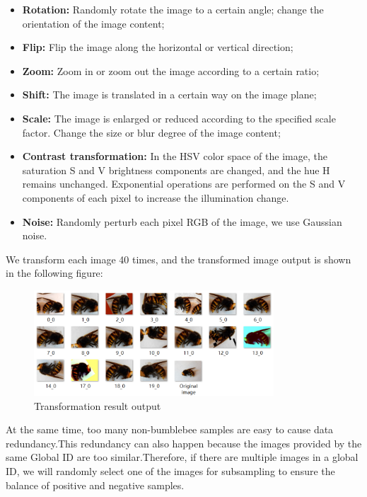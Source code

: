 \documentclass{mcmthesis}
\begin{document}
\begin{itemize}
	\item \textbf{Rotation:} Randomly rotate the image to a certain angle; change the orientation of the image content;
	\item \textbf{Flip:} Flip the image along the horizontal or vertical direction;
	\item \textbf{Zoom:} Zoom in or zoom out the image according to a certain ratio;
	\item \textbf{Shift:} The image is translated in a certain way on the image plane;
	\item \textbf{Scale:} The image is enlarged or reduced according to the specified scale factor. Change the size or blur degree of the image content;
	\item \textbf{Contrast transformation: }In the HSV color space of the image, the saturation S and V brightness components are changed, and the hue H remains unchanged. Exponential operations are performed on the S and V components of each pixel to increase the illumination change.
	\item \textbf{Noise:} Randomly perturb each pixel RGB of the image, we use Gaussian noise.
\end{itemize}

We transform each image 40 times, and the transformed image output is shown in the following figure:
\begin{figure}[H]
	\centering
	\includegraphics[width=0.8\textwidth]{screenshot013}
	\caption{Transformation result output}
	\label{fig:screenshot013}
\end{figure}

At the same time, too many non-bumblebee samples are easy to cause data redundancy.This redundancy can also happen because the images provided by the same Global ID are too similar.Therefore, if there are multiple images in a global ID, we will randomly select one of the images for subsampling to ensure the balance of positive and negative samples.

\hspace*{\fill}
\end{document}
